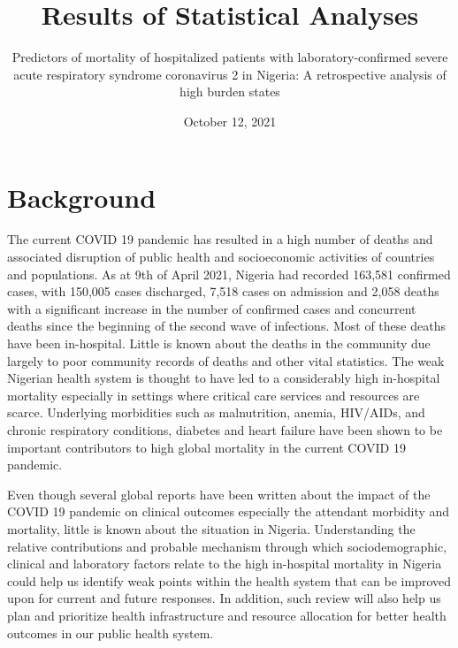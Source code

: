 \documentclass[
  10pt,
]{article}
\title{Results of Statistical Analyses}
\subtitle{Predictors of mortality of hospitalized patients with
laboratory-confirmed severe acute respiratory syndrome coronavirus 2 in
Nigeria: A retrospective analysis of high burden states}
\author{}
\date{\vspace{-2.5em}October 12, 2021}
\begin{document}
\maketitle

\newpage

\tableofcontents

\newpage

\listoftables

\newpage

\listoffigures

\newpage

\hypertarget{background}{%
\section{Background}\label{background}}

The current COVID 19 pandemic has resulted in a high number of deaths
and associated disruption of public health and socioeconomic activities
of countries and populations. As at 9th of April 2021, Nigeria had
recorded 163,581 confirmed cases, with 150,005 cases discharged, 7,518
cases on admission and 2,058 deaths with a significant increase in the
number of confirmed cases and concurrent deaths since the beginning of
the second wave of infections. Most of these deaths have been
in-hospital. Little is known about the deaths in the community due
largely to poor community records of deaths and other vital statistics.
The weak Nigerian health system is thought to have led to a considerably
high in-hospital mortality especially in settings where critical care
services and resources are scarce. Underlying morbidities such as
malnutrition, anemia, HIV/AIDs, and chronic respiratory conditions,
diabetes and heart failure have been shown to be important contributors
to high global mortality in the current COVID 19 pandemic.

Even though several global reports have been written about the impact of
the COVID 19 pandemic on clinical outcomes especially the attendant
morbidity and mortality, little is known about the situation in Nigeria.
Understanding the relative contributions and probable mechanism through
which sociodemographic, clinical and laboratory factors relate to the
high in-hospital mortality in Nigeria could help us identify weak points
within the health system that can be improved upon for current and
future responses. In addition, such review will also help us plan and
prioritize health infrastructure and resource allocation for better
health outcomes in our public health system.
\end{document}
